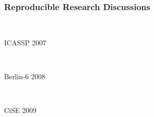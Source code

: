 \begin{frame}
 \frametitle{Reproducible Research Discussions}

  \begin{minipage}{0.3\textwidth}
  \begin{center}
  \vfill \ 
\end{center}
  \end{minipage} \hfill
   \begin{minipage}{0.65\textwidth}
  \begin{description}
    \item[ICASSP 2007] \ 
    \item[Berlin-6 2008] \
    \item[CiSE 2009] 
    \begin{itemize}

\end{itemize}
\end{description}
\end{minipage}
\end{frame}
